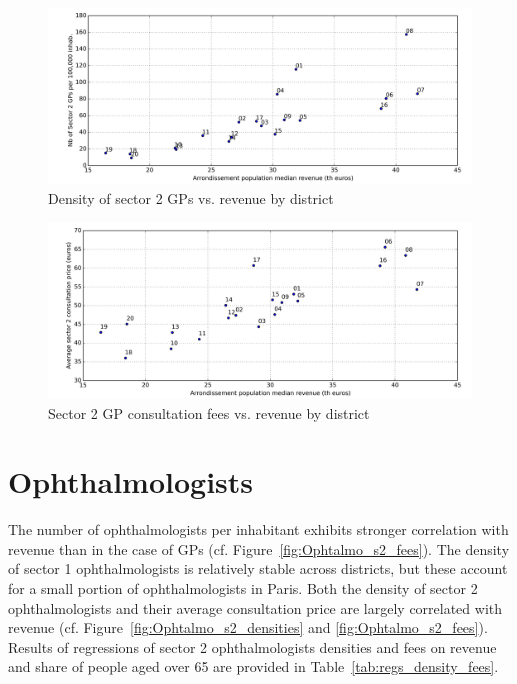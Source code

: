 \documentclass[11pt]{article}
\begin{document}
\begin{figure}[H]
    \caption{Density of sector 2 GPs vs. revenue by district}
		\label{fig:GP_s2_densities}
	\centering
		\includegraphics[width=16cm]{images/GP_Ardt_DensityS2VsRevenue.png}
\end{figure}

\begin{figure}[H]
    \caption{Sector 2 GP consultation fees vs. revenue by district}
		\label{fig:GP_s2_fees}
	\centering
		\includegraphics[width=16cm]{images/GP_Ardt_ConsultationS2VsRevenue.png}
\end{figure}

\section{Ophthalmologists}

The number of ophthalmologists per inhabitant exhibits stronger correlation with revenue than in the case of GPs (cf. Figure~\ref{fig:Ophtalmo_s2_fees}). The density of sector 1 ophthalmologists is relatively stable across districts, but these account for a small portion of ophthalmologists in Paris. Both the density of sector 2 ophthalmologists and their average consultation price are largely correlated with revenue (cf. Figure~\ref{fig:Ophtalmo_s2_densities} and \ref{fig:Ophtalmo_s2_fees}). Results of regressions of sector 2 ophthalmologists densities and fees on revenue and share of people aged over 65 are provided in Table~\ref{tab:regs_density_fees}.
\end{document}
